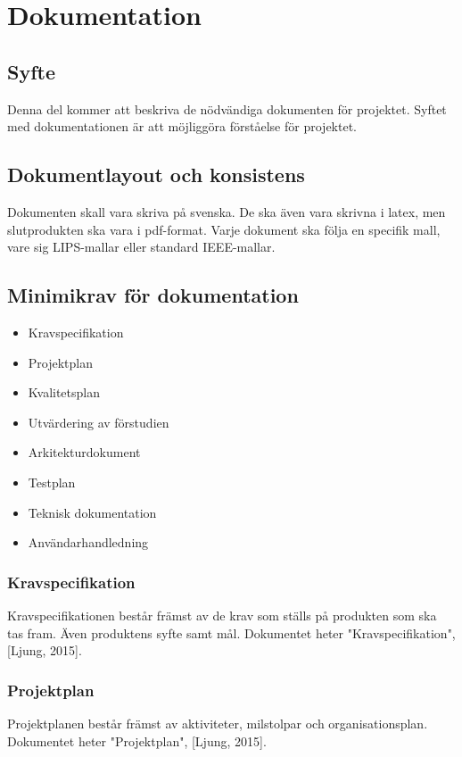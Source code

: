 \section{Dokumentation}

\subsection{Syfte}
Denna del kommer att beskriva de nödvändiga dokumenten för projektet. Syftet med dokumentationen är att möjliggöra förståelse för projektet.

\subsection{Dokumentlayout och konsistens}
Dokumenten skall vara skriva på svenska. De ska även vara skrivna i latex, men slutprodukten ska vara i pdf-format. Varje dokument ska följa en specifik mall, vare sig LIPS-mallar eller standard IEEE-mallar. 

\subsection{Minimikrav för dokumentation}
\begin{itemize}
\item Kravspecifikation
\item Projektplan
\item Kvalitetsplan
\item Utvärdering av förstudien
\item Arkitekturdokument
\item Testplan
\item Teknisk dokumentation
\item Användarhandledning
\end{itemize}

\subsubsection{Kravspecifikation}
Kravspecifikationen består främst av de krav som ställs på produkten som ska tas fram. Även produktens syfte samt mål. Dokumentet heter "Kravspecifikation", [Ljung, 2015].

\subsubsection{Projektplan}
Projektplanen består främst av aktiviteter, milstolpar och organisationsplan. Dokumentet heter "Projektplan", [Ljung, 2015].

